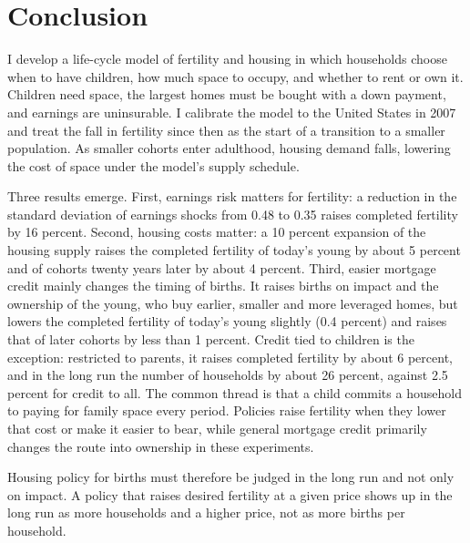 \section{Conclusion}
\label{sec:conclusion}

I develop a life-cycle model of fertility and housing in
which households choose when to have children, how much space to occupy, and
whether to rent or own it. Children need space, the largest homes must be
bought with a down payment, and earnings are uninsurable. I calibrate the
model to the United States in 2007 and treat the fall in fertility since then
as the start of a transition to a smaller population. As smaller cohorts
enter adulthood, housing demand falls, lowering the cost of space under the
model's supply schedule.

Three results emerge. First, earnings risk matters for fertility: a
reduction in the standard deviation of earnings shocks from
0.48 to 0.35 raises completed fertility by 16 percent. Second, housing costs
matter: a 10 percent expansion of the housing supply raises the completed
fertility of today's young by about 5 percent and of cohorts twenty years
later by about 4 percent. Third, easier mortgage credit mainly changes the
timing of births. It raises births on impact and the ownership of the young,
who buy earlier, smaller and more leveraged homes, but %
lowers the
completed fertility of today's young slightly (0.4 percent) and raises that of later cohorts by less than 1 percent. %
Credit tied to children is the exception: restricted to
parents, it raises completed fertility by about 6 percent, and in the long run
the number of households by about 26 percent, against 2.5 percent for credit
to all. The common thread
is that a child commits a household to paying for family space every period.
Policies raise fertility when they lower that cost or make it easier to bear,
while general mortgage credit primarily changes the route into ownership
in these experiments.

Housing policy for births must therefore be judged in the long run and not
only on impact. A policy that raises desired fertility at a given price shows
up in the long run as more households and a higher price, not as more births
per household.


